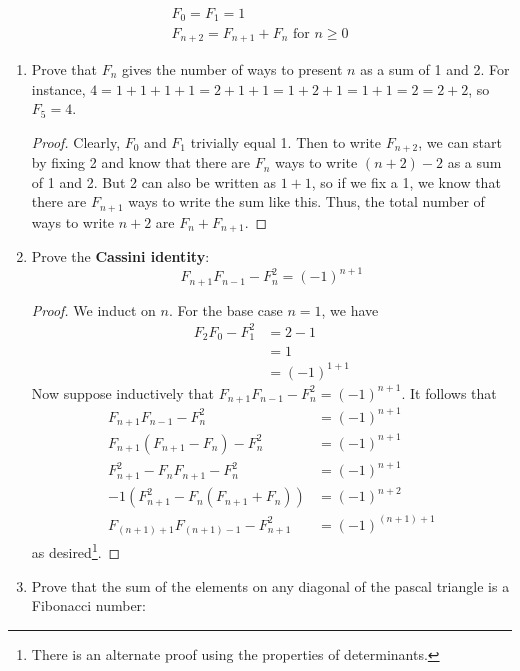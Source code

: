 \documentclass[../apprentice.tex]{subfiles}
\begin{document}
\begin{enumerate}
    \begin{gather*}
        F_0 = F_1 = 1\\
        F_{n+2} = F_{n+1}+F_n\text{ for }n\geq 0
    \end{gather*}
    \begin{enumerate}
        \item Prove that $F_n$ gives the number of ways to present $n$ as a sum of 1 and 2. For instance, $4=1+1+1+1=2+1+1=1+2+1=1+1=2=2+2$, so $F_5=4$.
        \begin{proof}
            Clearly, $F_0$ and $F_1$ trivially equal 1. Then to write $F_{n+2}$, we can start by fixing 2 and know that there are $F_n$ ways to write $(n+2)-2$ as a sum of 1 and 2. But 2 can also be written as $1+1$, so if we fix a 1, we know that there are $F_{n+1}$ ways to write the sum like this. Thus, the total number of ways to write $n+2$ are $F_n+F_{n+1}$.
        \end{proof}
        \item Prove the \textbf{Cassini identity}:
        \begin{equation*}
            F_{n+1}F_{n-1}-F_n^2 = (-1)^{n+1}
        \end{equation*}
        \begin{proof}
            We induct on $n$. For the base case $n=1$, we have
            \begin{align*}
                F_2F_0-F_1^2 &= 2-1\\
                &= 1\\
                &= (-1)^{1+1}
            \end{align*}
            Now suppose inductively that $F_{n+1}F_{n-1}-F_n^2=(-1)^{n+1}$. It follows that
            \begin{align*}
                F_{n+1}F_{n-1}-F_n^2 &= (-1)^{n+1}\\
                F_{n+1}(F_{n+1}-F_n)-F_n^2 &= (-1)^{n+1}\\
                F_{n+1}^2-F_nF_{n+1}-F_n^2 &= (-1)^{n+1}\\
                -1(F_{n+1}^2-F_n(F_{n+1}+F_n)) &= (-1)^{n+2}\\
                F_{(n+1)+1}F_{(n+1)-1}-F_{n+1}^2 &= (-1)^{(n+1)+1}
            \end{align*}
            as desired\footnote{There is an alternate proof using the properties of determinants.}.
        \end{proof}
        \item Prove that the sum of the elements on any diagonal of the pascal triangle is a Fibonacci number:

\end{enumerate}
\end{enumerate}
\end{document}
